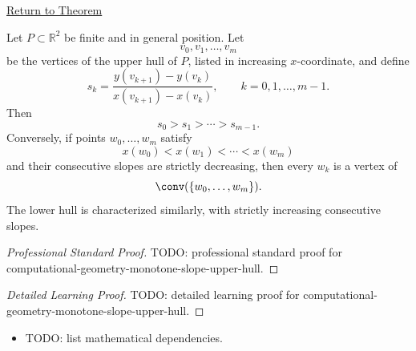 \newpage
{}
\label{prf:computational-geometry-monotone-slope-upper-hull}

\begin{remark*}[Return]
\hyperref[thm:computational-geometry-monotone-slope-upper-hull]{Return to Theorem}
\end{remark*}

\begin{theorem*}
Let \(P\subset\mathbb{R}^2\) be finite and in general position. Let
\[
  v_0,v_1,\dots,v_m
\]
be the vertices of the upper hull of \(P\), listed in increasing
\(x\)-coordinate, and define
\[
  s_k
  =
  \frac{y(v_{k+1})-y(v_k)}{x(v_{k+1})-x(v_k)},
  \qquad
  k=0,1,\dots,m-1.
\]
Then
\[
  s_0>s_1>\cdots>s_{m-1}.
\]
Conversely, if points \(w_0,\dots,w_m\) satisfy
\[
  x(w_0)<x(w_1)<\cdots<x(w_m)
\]
and their consecutive slopes are strictly decreasing, then every \(w_k\) is a
vertex of
\[
  \conv(\{w_0,\dots,w_m\}).
\]
The lower hull is characterized similarly, with strictly increasing consecutive
slopes.
\end{theorem*}

\begin{proof}[Professional Standard Proof]
\LRAProofBodyStart
TODO: professional standard proof for computational-geometry-monotone-slope-upper-hull.
\end{proof}

\begin{proof}[Detailed Learning Proof]
\LRAProofBodyStart
TODO: detailed learning proof for computational-geometry-monotone-slope-upper-hull.
\end{proof}

\begin{remark*}
\end{remark*}

\begin{dependencies}
\begin{itemize}
  \item TODO: list mathematical dependencies.
\end{itemize}
\end{dependencies}

\clearpage

